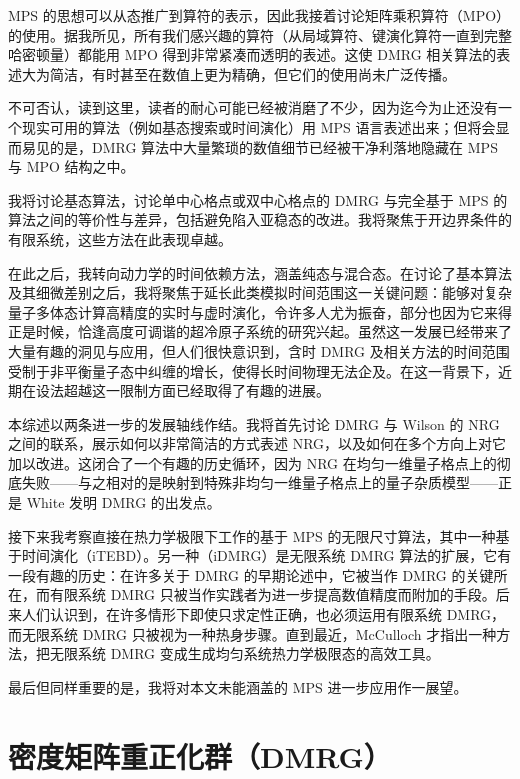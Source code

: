 \documentclass[a4paper,10pt,oneside,onecolumn,1p,times]{elsarticle}
\begin{document}
MPS 的思想可以从态推广到算符的表示，因此我接着讨论矩阵乘积算符（MPO）的使用\cite{VerstraeteRipoll04,McCulloch07,VerstraetePirvu08,Crosswhite08,Frowis10}。据我所见，所有我们感兴趣的算符（从局域算符、键演化算符一直到完整哈密顿量）都能用 MPO 得到非常紧凑而透明的表述。这使 DMRG 相关算法的表述大为简洁，有时甚至在数值上更为精确，但它们的使用尚未广泛传播。

不可否认，读到这里，读者的耐心可能已经被消磨了不少，因为迄今为止还没有一个现实可用的算法（例如基态搜索或时间演化）用 MPS 语言表述出来；但将会显而易见的是，DMRG 算法中大量繁琐的数值细节已经被干净利落地隐藏在 MPS 与 MPO 结构之中。 

我将讨论基态算法，讨论单中心格点或双中心格点的 DMRG 与完全基于 MPS 的算法之间的等价性与差异，包括避免陷入亚稳态的改进。我将聚焦于开边界条件的有限系统，这些方法在此表现卓越。

在此之后，我转向动力学的时间依赖方法，涵盖纯态与混合态。在讨论了基本算法及其细微差别之后，我将聚焦于延长此类模拟时间范围这一关键问题：能够对复杂量子多体态计算高精度的实时与虚时演化，令许多人尤为振奋，部分也因为它来得正是时候，恰逢高度可调谐的超冷原子系统的研究兴起。虽然这一发展已经带来了大量有趣的洞见与应用，但人们很快意识到，含时 DMRG 及相关方法的时间范围受制于非平衡量子态中纠缠的增长，使得长时间物理无法企及。在这一背景下，近期在设法超越这一限制方面已经取得了有趣的进展。

本综述以两条进一步的发展轴线作结。我将首先讨论 DMRG 与 Wilson 的 NRG 之间的联系，展示如何以非常简洁的方式表述 NRG，以及如何在多个方向上对它加以改进。这闭合了一个有趣的历史循环，因为 NRG 在均匀一维量子格点上的彻底失败——与之相对的是映射到特殊非均匀一维量子格点上的量子杂质模型——正是 White 发明 DMRG 的出发点\cite{WhiteNoack92}。

接下来我考察直接在热力学极限下工作的基于 MPS 的无限尺寸算法，其中一种基于时间演化（iTEBD）\cite{Vidal07}。另一种（iDMRG）\cite{McCulloch08}是无限系统 DMRG 算法的扩展，它有一段有趣的历史：在许多关于 DMRG 的早期论述中，它被当作 DMRG 的关键所在，而有限系统 DMRG 只被当作实践者为进一步提高数值精度而附加的手段。后来人们认识到，在许多情形下即使只求定性正确，也必须运用有限系统 DMRG，而无限系统 DMRG 只被视为一种热身步骤。直到最近，McCulloch\cite{McCulloch08} 才指出一种方法，把无限系统 DMRG 变成生成均匀系统热力学极限态的高效工具。 

最后但同样重要的是，我将对本文未能涵盖的 MPS 进一步应用作一展望。

\section{密度矩阵重正化群（DMRG）}
\end{document}
